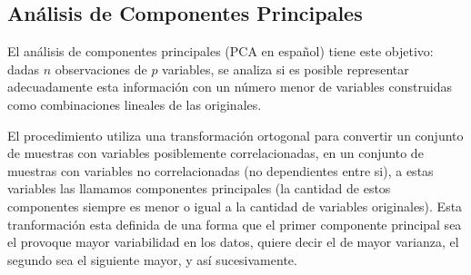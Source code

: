 \documentclass[a4paper]{article}
\begin{document}
\subsection{Análisis de Componentes Principales}

El análisis de componentes principales (PCA en español) tiene este objetivo: dadas $n$ observaciones de $p$ variables, se analiza si es posible representar adecuadamente esta información con un número menor de variables construidas como combinaciones lineales de las originales. 

El procedimiento utiliza una transformación ortogonal para convertir un conjunto de muestras con variables posiblemente correlacionadas, en un conjunto de muestras con variables no correlacionadas (no dependientes entre si), a estas variables las llamamos componentes principales (la cantidad de estos componentes siempre es menor o igual a la cantidad de variables originales).
Esta tranformación esta definida de una forma que el primer componente principal sea el provoque mayor variabilidad en los datos, quiere decir el de mayor varianza, el segundo sea el siguiente mayor, y así sucesivamente.


\newpage 
\end{document}
